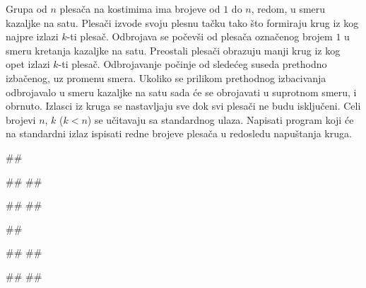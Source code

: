 \begin{Exercise}[label=613]
Grupa od $n$ plesača na kostimima ima brojeve od $1$ do $n$, redom, u smeru kazaljke na satu.
Plesači izvode svoju plesnu tačku tako što formiraju krug iz kog najpre izlazi $k$-ti plesač.
Odbrojava se počevši od plesača označenog brojem $1$ u smeru kretanja kazaljke na satu. 
Preostali plesači obrazuju manji krug iz kog opet izlazi $k$-ti plesač. Odbrojavanje počinje od
sledećeg suseda prethodno izbačenog, uz promenu smera. Ukoliko se prilikom prethodnog izbacivanja odbrojavalo 
u smeru kazaljke na satu sada će se obrojavati u suprotnom smeru, i obrnuto. Izlasci iz kruga se nastavljaju
sve dok svi plesači ne budu isključeni. 
Celi brojevi $n$, $k$ ($k < n$) se učitavaju sa standardnog ulaza. 
Napisati program koji će na standardni izlaz ispisati redne brojeve plesača u redosledu napuštanja kruga. 

\begin{minitest}
\begin{test}{1}
##

#\naslovUlaz#
##

#\naslovIzlaz# 
##
\end{test}
\end{minitest}
\begin{minitest}
\begin{test}{2}
##

#\naslovUlaz#
##

#\naslovIzlaz# 
## 
\end{test}
\end{minitest}
\end{Exercise}
